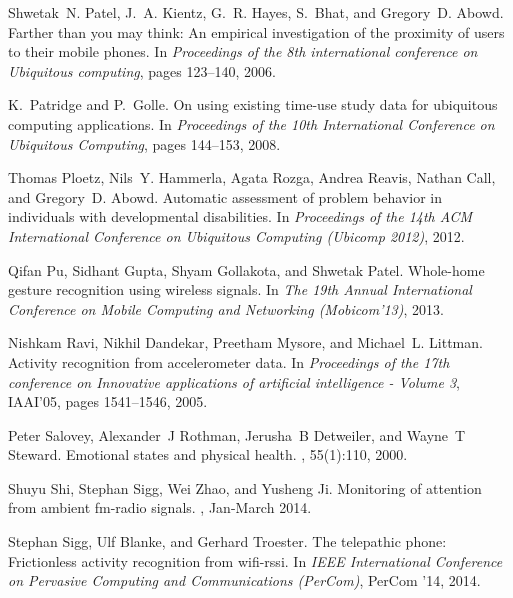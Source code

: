 \documentclass[12pt]{article}
\begin{document}
\begin{small}
\begin{thebibliography}{10}
Shwetak~N. Patel, J.~A. Kientz, G.~R. Hayes, S.~Bhat, and Gregory~D. Abowd.
\newblock Farther than you may think: An empirical investigation of the
  proximity of users to their mobile phones.
\newblock In {\em Proceedings of the 8th international conference on Ubiquitous
  computing}, pages 123--140, 2006.

K.~Patridge and P.~Golle.
\newblock On using existing time-use study data for ubiquitous computing
  applications.
\newblock In {\em Proceedings of the 10th International Conference on
  Ubiquitous Computing}, pages 144--153, 2008.

Thomas Ploetz, Nils~Y. Hammerla, Agata Rozga, Andrea Reavis, Nathan Call, and
  Gregory~D. Abowd.
\newblock Automatic assessment of problem behavior in individuals with
  developmental disabilities.
\newblock In {\em Proceedings of the 14th ACM International Conference on
  Ubiquitous Computing (Ubicomp 2012)}, 2012.

Qifan Pu, Sidhant Gupta, Shyam Gollakota, and Shwetak Patel.
\newblock Whole-home gesture recognition using wireless signals.
\newblock In {\em The 19th Annual International Conference on Mobile Computing
  and Networking (Mobicom'13)}, 2013.

Nishkam Ravi, Nikhil Dandekar, Preetham Mysore, and Michael~L. Littman.
\newblock Activity recognition from accelerometer data.
\newblock In {\em Proceedings of the 17th conference on Innovative applications
  of artificial intelligence - Volume 3}, IAAI'05, pages 1541--1546, 2005.

Peter Salovey, Alexander~J Rothman, Jerusha~B Detweiler, and Wayne~T Steward.
\newblock Emotional states and physical health.
, 55(1):110, 2000.

Shuyu Shi, Stephan Sigg, Wei Zhao, and Yusheng Ji.
\newblock Monitoring of attention from ambient fm-radio signals.
, Jan-March 2014.

Stephan Sigg, Ulf Blanke, and Gerhard Troester.
\newblock The telepathic phone: Frictionless activity recognition from
  wifi-rssi.
\newblock In {\em IEEE International Conference on Pervasive Computing and
  Communications (PerCom)}, PerCom '14, 2014.


\end{thebibliography}
\end{small}
\end{document}
